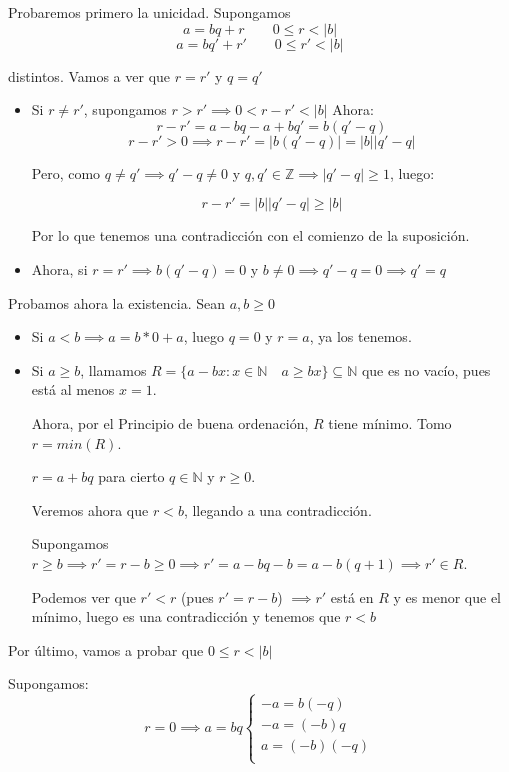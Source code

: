 \documentclass[11pt, a4paper, titlepage]{article}
\makeatletter
\renewenvironment{proof}[1][\proofname] {\vspace{-15pt}\par\pushQED{\qed}\normalfont\topsep6\p@\@plus6\p@\relax\trivlist\item[\hskip\labelsep\it#1\@addpunct{.}]\ignorespaces}{\popQED\endtrivlist\@endpefalse}
\providecommand{\ent}{\mathbb{Z}}
\providecommand{\nat}{\mathbb{N}}
\providecommand{\abs}[1]{\lvert#1\rvert}
\theoremstyle{theorem-style}
\theoremstyle{definition-style}
\theoremstyle{remark-style}
\theoremstyle{example-style}
\makeatother
\begin{document}
\begin{proof}
Probaremos primero la unicidad. Supongamos 
$$a=bq+r \quad \quad 0\leq r <\abs{b}$$   
$$a=bq'+r' \quad \quad 0 \leq r' < \abs{b}$$ 

distintos. Vamos a ver que $r=r'$ y $q=q'$

\begin{itemize}
	\item Si $r \neq r'$, supongamos $r > r' \implies 0 < r - r' < \abs{b}$
Ahora: 
$$ r-r' = a-bq - a +bq' = b(q' -q )$$
$$r-r' > 0 \implies r - r' = \abs{b(q' -q)} = \abs{b}\abs{q' -q}$$

Pero, como $q\neq q' \implies q'-q \neq 0$ y $q,q' \in \ent \implies \abs{q' -q} \geq 1 $, luego:

$$ r-r' = \abs{b}\abs{q' -q} \geq \abs{b}$$

Por lo que tenemos una contradicción con el comienzo de la suposición.

	\item Ahora, si $r=r'\implies b(q' -q) = 0$ y $b\neq 0 \implies q' -q=0 \implies q' =q$
\end{itemize}

Probamos ahora la existencia. Sean $a,b \geq 0$

\begin{itemize}
	\item Si $ a < b \implies a = b*0 + a$, luego $q=0$ y $r=a$, ya los tenemos.
	\item Si $a \geq b$, llamamos $R=\{a-bx: x\in \nat \quad a \geq bx\}\subseteq \nat$ que es no vacío, pues está al menos $x=1$.
	
	Ahora, por el Principio de buena ordenación, $R$ tiene mínimo. Tomo $r=min(R)$. 
	
$r=a+bq$ para cierto $q \in \nat$ y $ r \geq 0$.

Veremos ahora que $r < b$, llegando a una contradicción.

Supongamos $ r \geq b\implies r' = r-b \geq 0 \implies r' = a-bq -b = a -b(q+1)\implies r' \in R$.

Podemos ver que $r' < r$ (pues $r'=r-b$) $\implies  r'$ está en $R$ y es menor que el mínimo, luego es una contradicción y tenemos que $r < b$

\end{itemize}
Por último, vamos a probar que $0 \leq r < \abs{b}$

Supongamos: 
\[
r=0 \implies a=bq \begin{cases}
	-a = b(-q)\\
	-a = (-b)q \\
	 a = (-b)(-q)\\	
\end{cases}
\]


\end{proof}
\end{document}
